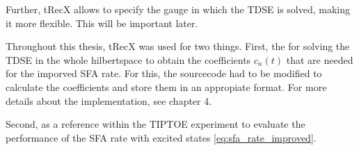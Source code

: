 Further, tRecX allows to specify the gauge in which the TDSE is solved, making it more flexible. 
This will be important later. 

\medskip
Throughout this thesis, tRecX was used for two things. 
First, the for solving the TDSE in the whole hilbertspace to obtain the coefficients $c_n(t)$ that are needed for the imporved SFA rate.
For this, the sourcecode had to be modified to calculate the coefficients and store them in an appropiate format.
For more details about the implementation, see chapter 4.

Second, as a reference within the TIPTOE experiment to evaluate the performance of the SFA rate with excited states \eqref{eq:sfa_rate_improved}.











